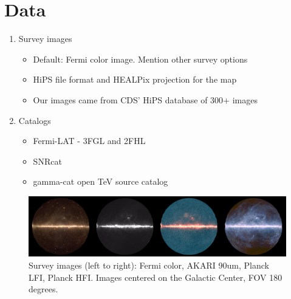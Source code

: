\section{Data}

\begin{enumerate}
\item Survey images

  \begin{itemize}

  \item Default: Fermi color image. Mention other survey options

  \item HiPS file format and HEALPix projection for the map

  \item Our images came from CDS' HiPS database of 300+ images

  \end{itemize}


\item Catalogs

  \begin{itemize}

  \item Fermi-LAT - 3FGL and 2FHL

  \item SNRcat

  \item gamma-cat open TeV source catalog

  \end{itemize}
\end{enumerate}


\begin{figure}[tb]
  \centerline{\includegraphics[width=\textwidth]{figures/four_images}}
  \caption{Survey images (left to right): Fermi color, AKARI 90um, Planck LFI, Planck HFI.
           Images centered on the Galactic Center, FOV 180 degrees.}
  \label{tab:images}
\end{figure}

